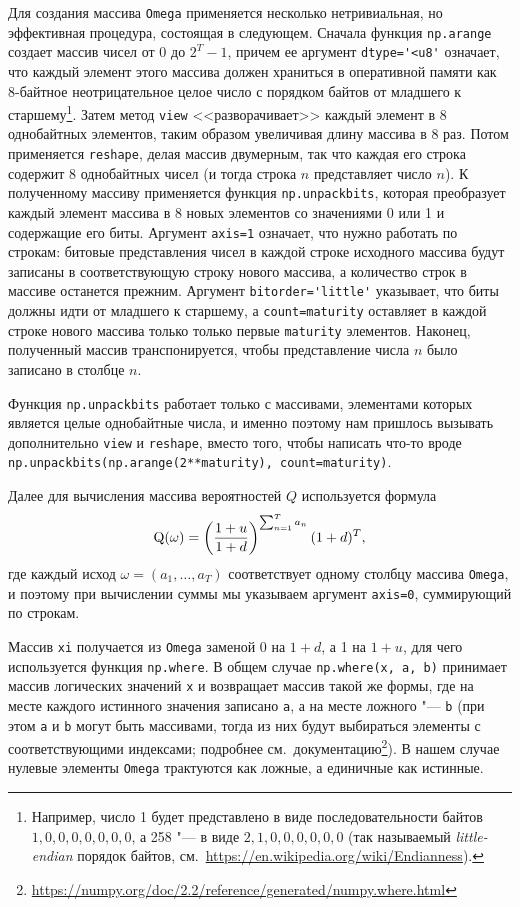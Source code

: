 Для создания массива \verb"Omega" применяется несколько нетривиальная, но эффективная процедура, состоящая в следующем.
Сначала функция \verb"np.arange" создает массив чисел от 0 до $2^T-1$, причем ее аргумент \verb"dtype='<u8'" означает, что каждый элемент этого массива должен храниться в оперативной памяти как 8-байтное неотрицательное целое число с порядком байтов от младшего к старшему\footnote{Например, число 1 будет представлено в виде последовательности байтов $1,0,0,0,0,0,0,0$, а 258 "--- в виде $2,1,0,0,0,0,0,0$ (так называемый \emph{little-endian} порядок байтов, см.\ \url{https://en.wikipedia.org/wiki/Endianness}).}.
Затем метод \verb"view" <<разворачивает>> каждый элемент в 8 однобайтных элементов, таким образом увеличивая длину массива в 8 раз.
Потом применяется \verb"reshape", делая массив двумерным, так что каждая его строка содержит 8 однобайтных чисел (и тогда строка $n$ представляет число $n$).
К полученному массиву применяется функция \verb"np.unpackbits", которая преобразует каждый элемент массива в 8 новых элементов со значениями 0 или 1 и содержащие его биты.
Аргумент \verb"axis=1" означает, что нужно работать по строкам: битовые представления чисел в каждой строке исходного массива будут записаны в соответствующую строку нового массива, а количество строк в массиве останется прежним. 
Аргумент \verb"bitorder='little'" указывает, что биты должны идти от младшего к старшему, а \verb"count=maturity" оставляет в каждой строке нового массива только только первые \verb"maturity" элементов.
Наконец, полученный массив транспонируется, чтобы представление числа $n$ было записано в столбце $n$.

\begin{remark}
Функция \verb"np.unpackbits" работает только с массивами, элементами которых является целые однобайтные числа, и именно поэтому нам пришлось вызывать дополнительно \verb"view" и \verb"reshape", вместо того, чтобы написать что-то вроде \verb"np.unpackbits(np.arange(2**maturity), count=maturity)".
\end{remark}

Далее для вычисления массива вероятностей $Q$ используется формула
\[
\mathrm{Q}(\omega) = \left(\frac{1+u}{1+d}\right)^{\sum_{n=1}^T a_n} (1+d)^T,
\]
где каждый исход $\omega=(a_1,\dots,a_T)$ соответствует одному столбцу массива \verb"Omega", и поэтому при вычислении суммы мы указываем аргумент \verb"axis=0", суммирующий по строкам.

Массив \verb"xi" получается из \verb"Omega" заменой 0 на $1+d$, а 1 на $1+u$, для чего используется функция \verb"np.where".
В общем случае \verb"np.where(x, a, b)" принимает массив логических значений \verb"x" и возвращает массив такой же формы, где на месте каждого истинного значения записано \verb"a", а на месте ложного "--- \verb"b" (при этом \verb"a" и \verb"b" могут быть массивами, тогда из них будут выбираться элементы с соответствующими индексами; подробнее см.~документацию\footnote{\url{https://numpy.org/doc/2.2/reference/generated/numpy.where.html}}).
В нашем случае нулевые элементы \verb"Omega" трактуются как ложные, а единичные как истинные. 


